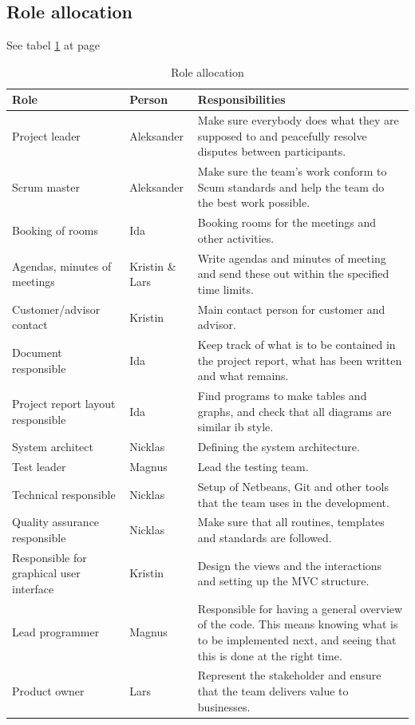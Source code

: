 \subsection{Role allocation}
See tabel \ref{tab:roleallocation} at page \pageref{tab:roleallocation}
\begin{table}
\begin{tabularx}{\linewidth}{>{\setlength\hsize{.5\hsize}}X|>{\setlength\hsize{0.3\hsize}}X|>{\setlength\hsize{1\hsize}}X}
\textbf{Role} & \textbf{Person} & \textbf{Responsibilities} \\ \hline \hline
Project leader & Aleksander & Make sure everybody does what they are supposed to and peacefully resolve disputes between participants. \\ \hline
Scrum master & Aleksander & Make sure the team’s work conform to Scum standards and help the team do the best work possible. \\ \hline
Booking of rooms & Ida & Booking rooms for the meetings and other activities. \\ \hline
Agendas, minutes of meetings & Kristin \& Lars &Write agendas and minutes of meeting and send these out within the specified time limits. \\ \hline
Customer/advisor contact & Kristin & Main contact person for customer and advisor. \\ \hline
Document responsible & Ida &Keep track of what is to be contained in the project report, what has been written and what remains. \\ \hline
Project report layout responsible & Ida &Find programs to make tables and graphs, and check that all diagrams are similar ib style. \\ \hline
System architect & Nicklas & Defining the system architecture. \\ \hline
Test leader & Magnus & Lead the testing team. \\ \hline
Technical responsible & Nicklas & Setup of Netbeans, Git and other tools that the team uses in the development. \\ \hline
Quality assurance responsible & Nicklas & Make sure that all routines, templates and standards are followed. \\ \hline
Responsible for graphical user interface & Kristin & Design the views and the interactions and setting up the MVC structure. \\ \hline
Lead programmer & Magnus & Responsible for having a general overview of the code. This means knowing what is to be implemented next, and seeing that this is done at the right time. \\ \hline
Product owner & Lars & Represent the stakeholder and ensure that the team delivers value to businesses.
\end{tabularx}
\caption {Role allocation} \label{tab:roleallocation}
\end{table}

